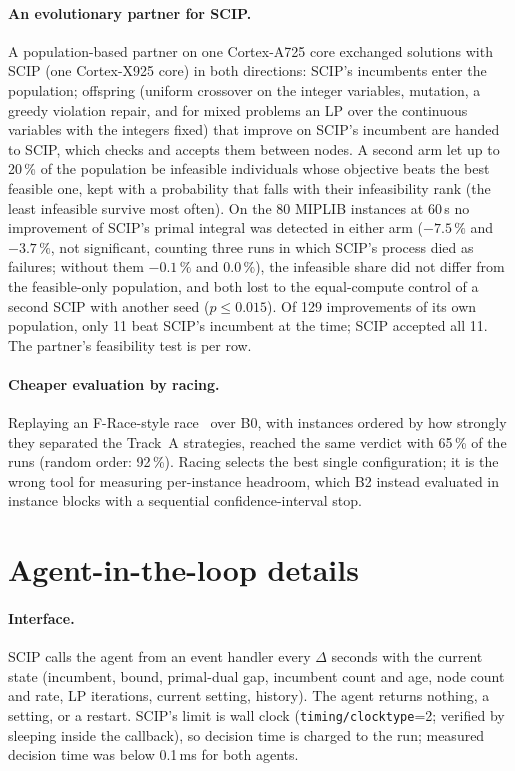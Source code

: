 \paragraph{An evolutionary partner for SCIP.} A population-based partner on one Cortex-A725 core exchanged solutions with
SCIP (one Cortex-X925 core) in both directions: SCIP's incumbents enter the population; offspring (uniform crossover on
the integer variables, mutation, a greedy violation repair, and for mixed problems an LP over the continuous variables
with the integers fixed) that improve on SCIP's incumbent are handed to SCIP, which checks and accepts them between
nodes. A second arm let up to 20\,\% of the population be infeasible individuals whose objective beats the best
feasible one, kept with a probability that falls with their infeasibility rank (the least infeasible survive most
often). On the 80 MIPLIB instances at 60\,s no improvement of SCIP's primal integral was detected in either arm ($-7.5\,\%$ and $-3.7\,\%$, not
significant, counting three runs in which SCIP's process died as failures; without them $-0.1\,\%$ and $0.0\,\%$), the
infeasible share did not differ from the feasible-only population, and both lost to the equal-compute control of a
second SCIP with another seed ($p\le0.015$). Of 129 improvements of its own population, only 11
beat SCIP's incumbent at the time; SCIP accepted all 11. The partner's feasibility test is per row.

\paragraph{Cheaper evaluation by racing.} Replaying an F-Race-style race~\citep{birattari2002racing} over B0, with instances ordered by how strongly they separated the Track~A strategies, reached the
same verdict with 65\,\% of the runs (random order: 92\,\%). Racing selects the best single configuration; it is the
wrong tool for measuring per-instance headroom, which B2 instead evaluated in instance blocks with a sequential
confidence-interval stop.

\section{Agent-in-the-loop details}\label{app:agents}
\paragraph{Interface.} SCIP calls the agent from an event handler every $\Delta$ seconds with the current state
(incumbent, bound, primal-dual gap, incumbent count and age, node count and rate, LP iterations, current setting,
history). The agent returns nothing, a setting, or a restart. SCIP's limit is wall clock
(\texttt{timing/clocktype}=2; verified by sleeping inside the callback), so decision time is charged to the run;
measured decision time was below 0.1\,ms for both agents.
